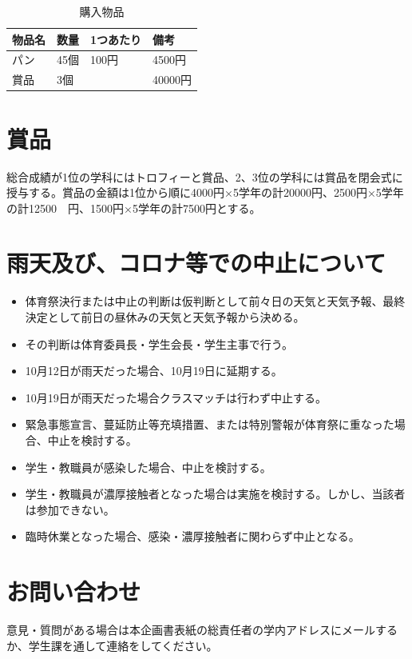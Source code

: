 \documentclass[titlepage]{jarticle}
\begin{document}
\begin{table}[H]
\centering
\caption{購入物品}
\begin{tabular}{llll}
    物品名&数量&1つあたり&備考\\ \hline\hline
パン & 45個 & 100円 & 4500円  \\
賞品 & 3個  &      & 40000円
\end{tabular}
\end{table}
\clearpage
 \section{賞品}
総合成績が1位の学科にはトロフィーと賞品、2、3位の学科には賞品を閉会式に授与する。賞品の金額は1位から順に4000円×5学年の計20000円、2500円×5学年の計12500　円、1500円×5学年の計7500円とする。
 \section{雨天及び、コロナ等での中止について}
  \begin{itemize}
\item 体育祭決行または中止の判断は仮判断として前々日の天気と天気予報、最終決定として前日の昼休みの天気と天気予報から決める。
\item その判断は体育委員長・学生会長・学生主事で行う。
\item 10月12日が雨天だった場合、10月19日に延期する。
\item 10月19日が雨天だった場合クラスマッチは行わず中止する。
\item 緊急事態宣言、蔓延防止等充填措置、または特別警報が体育祭に重なった場合、中止を検討する。
\item 学生・教職員が感染した場合、中止を検討する。
\item 学生・教職員が濃厚接触者となった場合は実施を検討する。しかし、当該者は参加できない。
\item 臨時休業となった場合、感染・濃厚接触者に関わらず中止となる。
\end{itemize}
 \section{お問い合わせ}
意見・質問がある場合は本企画書表紙の総責任者の学内アドレスにメールするか、学生課を通して連絡をしてください。
\end{document}
